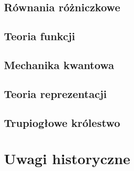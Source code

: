\begin{multicols*}{2} \raggedcolumns \chapter{Równania różniczkowe}
	
\end{multicols*}

\begin{multicols*}{2} \raggedcolumns \chapter{Teoria funkcji}
\end{multicols*}

\begin{multicols*}{2} \raggedcolumns \chapter{Mechanika kwantowa}
	
\end{multicols*}

\begin{multicols*}{2} \raggedcolumns \chapter{Teoria reprezentacji}
	
\end{multicols*}


\begin{multicols*}{2} \raggedcolumns \chapter{Trupiogłowe królestwo}
\end{multicols*}

\chapter{Uwagi historyczne}
